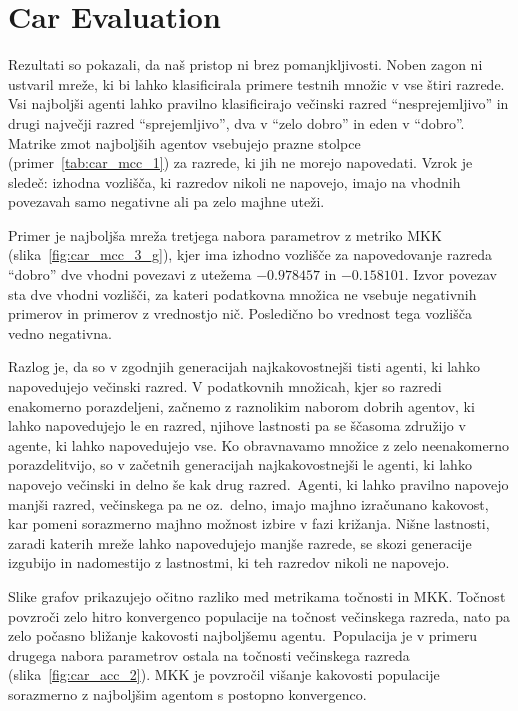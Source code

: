 \documentclass[a4paper,12pt,openright]{book}
\begin{document}
    \section{Car Evaluation}\label{sec:rezultati-car-evaluation}
    Rezultati so pokazali, da naš pristop ni brez pomanjkljivosti.
    Noben zagon ni ustvaril mreže, ki bi lahko klasificirala primere testnih množic v vse štiri razrede.
    Vsi najboljši agenti lahko pravilno klasificirajo večinski razred \enquote{nesprejemljivo} in drugi največji
    razred \enquote{sprejemljivo}, dva v \enquote{zelo dobro} in eden v \enquote{dobro}.
    Matrike zmot najboljših agentov vsebujejo prazne stolpce (primer~\ref{tab:car_mcc_1}) za razrede, ki jih ne morejo napovedati.
    Vzrok je sledeč: izhodna vozlišča, ki razredov nikoli ne napovejo, imajo na vhodnih povezavah samo negativne ali pa zelo majhne uteži.

    Primer je najboljša mreža tretjega nabora parametrov z metriko MKK (slika~\ref{fig:car_mcc_3_g}), kjer ima izhodno
    vozlišče za napovedovanje razreda \enquote{dobro} dve vhodni povezavi z utežema $-0.978457$ in $-0.158101$.
    Izvor povezav sta dve vhodni vozlišči, za kateri podatkovna množica ne vsebuje negativnih primerov in primerov z vrednostjo nič.
    Posledično bo vrednost tega vozlišča vedno negativna.

    Razlog je, da so v zgodnjih generacijah najkakovostnejši tisti agenti, ki lahko napovedujejo večinski razred.
    V podatkovnih množicah, kjer so razredi enakomerno porazdeljeni, začnemo z raznolikim naborom dobrih agentov, ki lahko napovedujejo
    le en razred, njihove lastnosti pa se ščasoma združijo v agente, ki lahko napovedujejo vse.
    Ko obravnavamo množice z zelo neenakomerno porazdelitvijo, so v začetnih generacijah najkakovostnejši le agenti, ki
    lahko napovejo večinski in delno še kak drug razred.\ Agenti, ki lahko pravilno napovejo manjši razred, večinskega pa ne oz.\ delno,
    imajo majhno izračunano kakovost, kar pomeni sorazmerno majhno možnost izbire v fazi križanja.
    Nišne lastnosti, zaradi katerih mreže lahko napovedujejo manjše razrede, se skozi generacije izgubijo in nadomestijo z
    lastnostmi, ki teh razredov nikoli ne napovejo.

    Slike grafov prikazujejo očitno razliko med metrikama točnosti in MKK.
    Točnost povzroči zelo hitro konvergenco populacije na točnost večinskega razreda, nato pa zelo počasno bližanje kakovosti
    najboljšemu agentu.\ Populacija je v primeru drugega nabora parametrov ostala na točnosti večinskega razreda (slika~\ref{fig:car_acc_2}).
    MKK je povzročil višanje kakovosti populacije sorazmerno z najboljšim agentom s postopno konvergenco.
\end{document}
